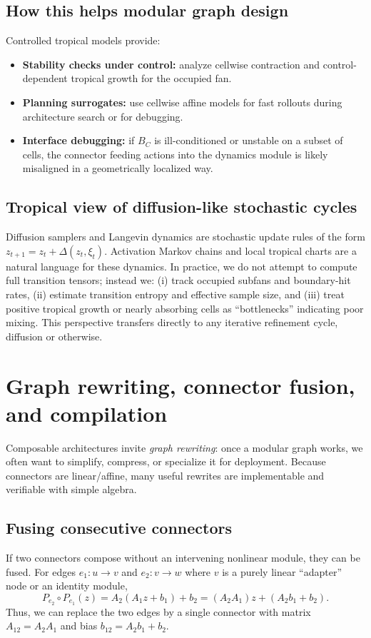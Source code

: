 \documentclass[11pt]{article}
\theoremstyle{definition}
\theoremstyle{plain}
\theoremstyle{remark}
\begin{document}
\subsection{How this helps modular graph design}
Controlled tropical models provide:
\begin{itemize}[leftmargin=2em]
\item \textbf{Stability checks under control:} analyze cellwise contraction and control-dependent tropical growth for the occupied fan.
\item \textbf{Planning surrogates:} use cellwise affine models for fast rollouts during architecture search or for debugging.
\item \textbf{Interface debugging:} if $B_C$ is ill-conditioned or unstable on a subset of cells, the connector feeding actions into the dynamics module is likely misaligned in a geometrically localized way.
\end{itemize}

\subsection{Tropical view of diffusion-like stochastic cycles}
Diffusion samplers and Langevin dynamics are stochastic update rules of the form $z_{t+1}=z_t + \Delta(z_t,\xi_t)$.
Activation Markov chains and local tropical charts are a natural language for these dynamics.
In practice, we do not attempt to compute full transition tensors; instead we:
(i) track occupied subfans and boundary-hit rates,
(ii) estimate transition entropy and effective sample size, and
(iii) treat positive tropical growth or nearly absorbing cells as ``bottlenecks'' indicating poor mixing.
This perspective transfers directly to any iterative refinement cycle, diffusion or otherwise.



\section{Graph rewriting, connector fusion, and compilation}
\label{app:compilation}

Composable architectures invite \emph{graph rewriting}: once a modular graph works, we often want to simplify, compress, or specialize it for deployment.
Because connectors are linear/affine, many useful rewrites are implementable and verifiable with simple algebra.

\subsection{Fusing consecutive connectors}
If two connectors compose without an intervening nonlinear module, they can be fused.
For edges $e_1:u\to v$ and $e_2:v\to w$ where $v$ is a purely linear ``adapter'' node or an identity module,
\[
P_{e_2}\circ P_{e_1}(z) = A_2(A_1 z + b_1)+b_2 = (A_2A_1)z + (A_2 b_1+b_2).
\]
Thus, we can replace the two edges by a single connector with matrix $A_{12}=A_2A_1$ and bias $b_{12}=A_2b_1+b_2$.
\end{document}
